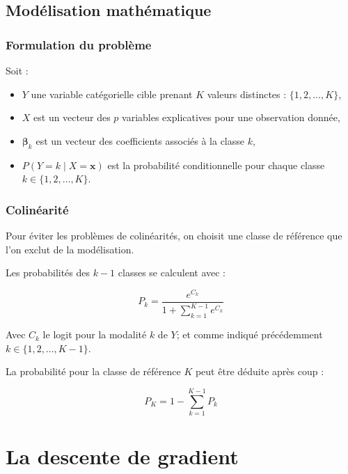 \documentclass[10pt,french]{report}
\begin{document}
    \subsection{Modélisation mathématique\cite{makisreglog}}
    
    \subsubsection{Formulation du problème}
    
    Soit :
    \begin{itemize}
    	\item $Y$ une variable catégorielle cible prenant $K$ valeurs distinctes : $\{1, 2, \dots, K\}$,
    	\item $X$ est un vecteur des $p$ variables explicatives pour une observation donnée,
    	\item $\boldsymbol{\beta}_k$ est un vecteur des coefficients associés à la classe $k$,
    	\item $P(Y = k \mid X = \mathbf{x})$ est la probabilité conditionnelle pour chaque classe $k \in \{1, 2, \dots, K\}$.
    \end{itemize}
    
    \subsubsection{Colinéarité}
    
    Pour éviter les problèmes de colinéarités, on choisit une classe de référence que l'on exclut de la modélisation.
    
    Les probabilités des $k-1$ classes se calculent avec :
    
    \begin{equation}
    	P_k = \frac{e^{C_k}}{1+\sum_{k=1}^{K-1}e^{C_k}}
    \end{equation}
    
    Avec $C_k$ le logit pour la modalité $k$ de $Y$; et comme indiqué précédemment $k \in \{1, 2, \dots, K-1\}$.
    
    La probabilité pour la classe de référence $K$ peut être déduite après coup :
    
    \begin{equation}
    	P_K = 1 - \sum_{k=1}^{K-1}P_k
    \end{equation}
    
    \section{La descente de gradient}
    
\end{document}
